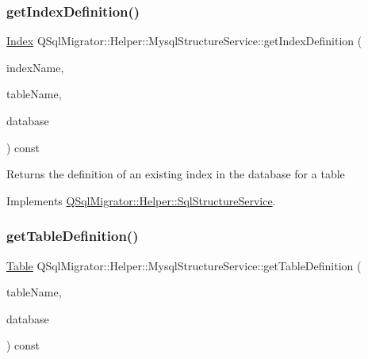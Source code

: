 \subsubsection{\texorpdfstring{get\+Index\+Definition()}{getIndexDefinition()}}
{\footnotesize\ttfamily \hyperlink{class_q_sql_migrator_1_1_structure_1_1_index}{Index} Q\+Sql\+Migrator\+::\+Helper\+::\+Mysql\+Structure\+Service\+::get\+Index\+Definition (\begin{DoxyParamCaption}\item[{const Q\+String \&}]{index\+Name,  }\item[{const Q\+String \&}]{table\+Name,  }\item[{Q\+Sql\+Database}]{database }\end{DoxyParamCaption}) const\hspace{0.3cm}{\ttfamily [virtual]}}

\begin{DoxyReturn}{Returns}
the definition of an existing index in the database for a table 
\end{DoxyReturn}


Implements \hyperlink{class_q_sql_migrator_1_1_helper_1_1_sql_structure_service_ab62049f95710fc0965097f08b410e790}{Q\+Sql\+Migrator\+::\+Helper\+::\+Sql\+Structure\+Service}.

\mbox{\label{class_q_sql_migrator_1_1_helper_1_1_mysql_structure_service_a67d203e233e158e2a57bfe1b417c549f}} 
\subsubsection{\texorpdfstring{get\+Table\+Definition()}{getTableDefinition()}}
{\footnotesize\ttfamily \hyperlink{class_q_sql_migrator_1_1_structure_1_1_table}{Table} Q\+Sql\+Migrator\+::\+Helper\+::\+Mysql\+Structure\+Service\+::get\+Table\+Definition (\begin{DoxyParamCaption}\item[{const Q\+String \&}]{table\+Name,  }\item[{Q\+Sql\+Database}]{database }\end{DoxyParamCaption}) const\hspace{0.3cm}{\ttfamily [virtual]}}

